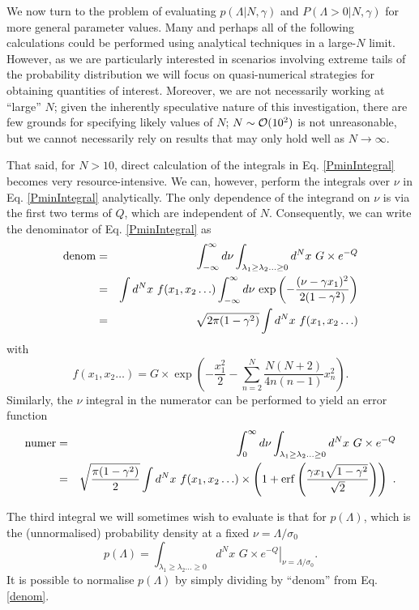 \documentclass[12pt]{article}
\begin{document}
We now turn to the problem of evaluating $p(\Lambda|N,\gamma)$ and $P(\Lambda>0|N,\gamma)$  for more general parameter values. Many and perhaps all of the following calculations could be performed using analytical techniques in a large-$N$ limit. However,  as we are particularly interested in scenarios involving extreme tails of  the probability distribution we will focus on quasi-numerical strategies for obtaining quantities of interest. Moreover, we are  not necessarily working at ``large'' $N$; given the inherently speculative nature of this investigation, there are few  grounds for specifying likely values of $N$;  $N\sim{\cal O}(10^2)$ is not unreasonable, but we cannot necessarily rely on results that may only hold well as $N\rightarrow \infty$. 

That said, for $N>10$, direct calculation of the integrals in Eq. \ref{PminIntegral} becomes very resource-intensive. We can, however, perform the integrals over $\nu$ in Eq. \ref{PminIntegral} analytically. The only dependence of the integrand on $\nu$ is via the first two terms of $Q$, which are independent of $N$. Consequently, we can write the denominator of Eq. \ref{PminIntegral} as 
%
\begin{eqnarray}\label{denom}
\nonumber {\rm denom} &=&
\int^\infty_{-\infty} d\nu \int_{\lambda_1 \geq \lambda_2 \ldots \geq 0} d^Nx \,\,G \times e^{-Q} \\ 
\nonumber &=&  \int d^Nx\,\, f(x_1,x_2 \ldots )  \int^\infty_{-\infty} d\nu \,\exp\left(-\frac{(\nu- \gamma x_1)^2}{2(1-\gamma^2)}\right)\\
&=& \sqrt{2\pi (1-\gamma^2)}  \int d^N x \,\, f(x_1,x_2 \ldots )
\end{eqnarray}
%
with
%
\begin{equation*} f(x_1,x_2 \ldots ) =  G\times \exp\left(-\frac{x_1^2}{2}-\sum_{n=2}^N\frac{N(N+2)}{4n(n-1)}x_n^2 \right).
\end{equation*}
% 
Similarly, the $\nu$ integral in the numerator can be performed to yield an error function
%
\begin{eqnarray}\label{numer}
\nonumber {\rm numer} &=&
\int^\infty_{0} d\nu \int_{\lambda_1 \geq \lambda_2 \ldots \geq 0}d^N x\,\, G \times e^{-Q} \\ 
&=& \sqrt{\frac{\pi (1-\gamma^2)}{2}}  \int d^N x \,\, f(x_1,x_2 \ldots )\times \left(1+{\rm erf}\left(\frac{\gamma x_1 \sqrt{1-\gamma^2}}{\sqrt{2}}\right) \right)\,\, .
\end{eqnarray}

The third integral we will sometimes wish to evaluate is that for $p(\Lambda)$, which is the (unnormalised) probability density at a fixed $\nu=\Lambda/\sigma_0$
%
\begin{equation}\label{plam}
p(\Lambda) = \int_{\lambda_1 \geq \lambda_2 \ldots \geq 0}d^N x\,\, G\times \left.e^{-Q}\right|_{\nu=\Lambda/\sigma_0}.
\end{equation}
%
It is possible to normalise $p(\Lambda)$ by simply dividing by ``denom'' from Eq. \eqref{denom}.
\end{document}
